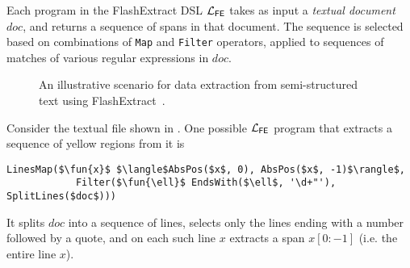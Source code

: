 Each program in the FlashExtract DSL $\mathcal{L}_{\mathsf{FE}}$ takes as input a \emph{textual document} $doc$, and returns a sequence
of spans in that document.
The sequence is selected based on combinations of \texttt{Map} and \texttt{Filter} operators, applied to sequences of
matches of various regular expressions in $doc$.

\begin{figure}[t]
    \centering
    \begin{tcbraster}[beamer, raster columns=1, size=minimal]
    \end{tcbraster}
    \caption{An illustrative scenario for data extraction from semi-structured text using FlashExtract~\cite[Figure
    1]{flashextract}.}
    \label{fig:example:flashextract}
    \vspace{-\baselineskip}
\end{figure}

\begin{example}
    \label{ex:background:fe}
    Consider the textual file shown in .
    One possible $\mathcal{L}_{\mathsf{FE}}$ program that extracts a sequence of yellow regions from it is
    \begin{lstlisting}[language=dsl]
        LinesMap($\fun{x}$ $\langle$AbsPos($x$, 0), AbsPos($x$, -1)$\rangle$,
            Filter($\fun{\ell}$ EndsWith($\ell$, '\d+"'), SplitLines($doc$)))
    \end{lstlisting}
    It splits $doc$ into a sequence of lines, selects only the lines ending with a number followed by a quote, and on
    each such line $x$ extracts a span $x[0:-1]$ (i.e. the entire line $x$).
\end{example}

